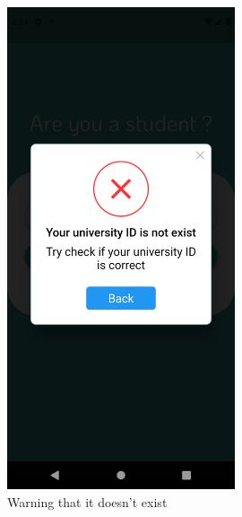 \documentclass[12pt]{article}
\begin{document}
\begin{figure}[h!]
\centerline{\includegraphics[width=0.6\textwidth]{./Screenshots/4.PNG}}
  \caption{Warning that it doesn't exist}
\end{figure}
\end{document}
